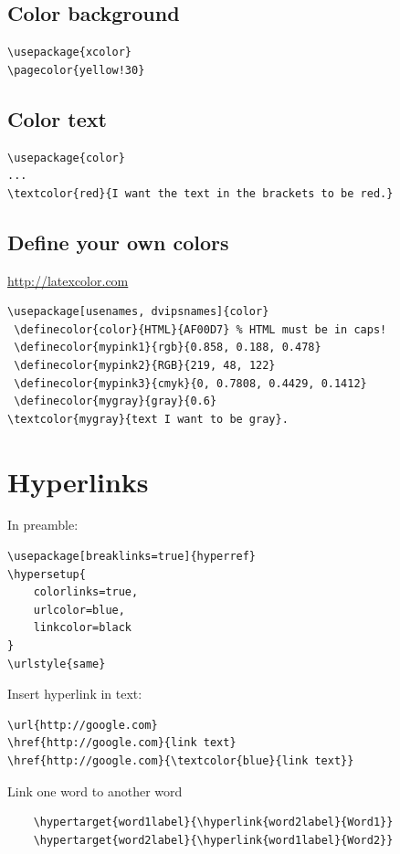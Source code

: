 \documentclass{article}
\begin{document}
\subsection{Color background }
\begin{verbatim}
\usepackage{xcolor}
\pagecolor{yellow!30}
\end{verbatim}

\subsection{Color text}
\begin{verbatim}
\usepackage{color}
...
\textcolor{red}{I want the text in the brackets to be red.}
\end{verbatim}

\subsection{Define your own colors}\label{definecolors}
\url{http://latexcolor.com}
\begin{verbatim}
\usepackage[usenames, dvipsnames]{color}
 \definecolor{color}{HTML}{AF00D7} % HTML must be in caps!
 \definecolor{mypink1}{rgb}{0.858, 0.188, 0.478}
 \definecolor{mypink2}{RGB}{219, 48, 122}
 \definecolor{mypink3}{cmyk}{0, 0.7808, 0.4429, 0.1412}
 \definecolor{mygray}{gray}{0.6}
\textcolor{mygray}{text I want to be gray}.
\end{verbatim}

\section{Hyperlinks}
In preamble:
\begin{lstlisting}
\usepackage[breaklinks=true]{hyperref}
\hypersetup{
    colorlinks=true,
    urlcolor=blue,
    linkcolor=black
}
\urlstyle{same}
\end{lstlisting}

Insert hyperlink in text:
\begin{lstlisting}
\url{http://google.com}
\href{http://google.com}{link text}
\href{http://google.com}{\textcolor{blue}{link text}}
\end{lstlisting}

Link one word to another word
\begin{lstlisting}
    \hypertarget{word1label}{\hyperlink{word2label}{Word1}}
    \hypertarget{word2label}{\hyperlink{word1label}{Word2}}
\end{lstlisting}
\end{document}
